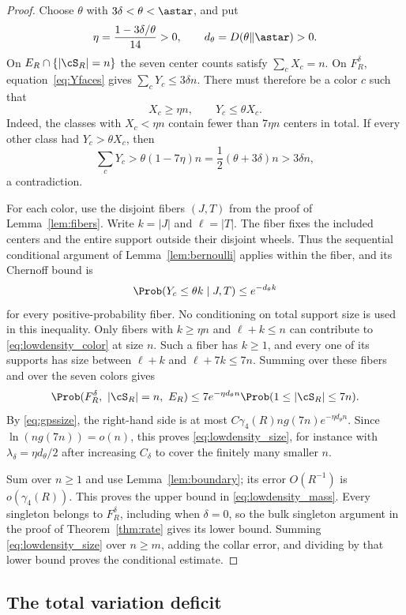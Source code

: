 \begin{proof}
Choose $\theta$ with $3\delta<\theta<\astar$, and put
\[
 \eta=\frac{1-3\delta/\theta}{14}>0,\qquad
 d_\theta=D(\theta\Vert\astar)>0.
\]
On $E_R\cap\{|\cS_R|=n\}$ the seven center counts satisfy $\sum_cX_c=n$. On $F_R^\delta$, equation~\eqref{eq:Yfaces} gives $\sum_cY_c\le3\delta n$. There must therefore be a color $c$ such that
\begin{equation}\label{eq:lowdensity_color}
 X_c\ge\eta n,\qquad Y_c\le\theta X_c.
\end{equation}
Indeed, the classes with $X_c<\eta n$ contain fewer than $7\eta n$ centers in total. If every other class had $Y_c>\theta X_c$, then
\[
 \sum_cY_c>\theta(1-7\eta)n=\frac12(\theta+3\delta)n>3\delta n,
\]
a contradiction.

For each color, use the disjoint fibers $(J,T)$ from the proof of Lemma~\ref{lem:fibers}. Write $k=|J|$ and $\ell=|T|$. The fiber fixes the included centers and the entire support outside their disjoint wheels. Thus the sequential conditional argument of Lemma~\ref{lem:bernoulli} applies within the fiber, and its Chernoff bound is
\[
 \Prob(Y_c\le\theta k\mid J,T)\le e^{-d_\theta k}
\]
for every positive-probability fiber. No conditioning on total support size is used in this inequality. Only fibers with $k\ge\eta n$ and $\ell+k\le n$ can contribute to \eqref{eq:lowdensity_color} at size $n$. Such a fiber has $k\ge1$, and every one of its supports has size between $\ell+k$ and $\ell+7k\le7n$. Summing over these fibers and over the seven colors gives
\[
 \Prob(F_R^\delta,\ |\cS_R|=n,\ E_R)
 \le7e^{-\eta d_\theta n}\Prob(1\le|\cS_R|\le7n).
\]
By \eqref{eq:gpssize}, the right-hand side is at most $C\gamma_4(R)ng(7n)e^{-\eta d_\theta n}$. Since $\ln(ng(7n))=o(n)$, this proves \eqref{eq:lowdensity_size}, for instance with $\lambda_\delta=\eta d_\theta/2$ after increasing $C_\delta$ to cover the finitely many smaller $n$.

Sum over $n\ge1$ and use Lemma~\ref{lem:boundary}; its error $O(R^{-1})$ is $o(\gamma_4(R))$. This proves the upper bound in \eqref{eq:lowdensity_mass}. Every singleton belongs to $F_R^\delta$, including when $\delta=0$, so the bulk singleton argument in the proof of Theorem~\ref{thm:rate} gives its lower bound. Summing \eqref{eq:lowdensity_size} over $n\ge m$, adding the collar error, and dividing by that lower bound proves the conditional estimate.
\end{proof}

\subsection{The total variation deficit}\label{sec:TV}

